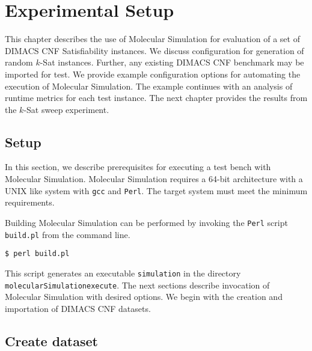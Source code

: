 \chapter{Experimental Setup}


This chapter describes the use of Molecular Simulation for evaluation of a set of DIMACS CNF {\sc Satisfiability} instances.  We discuss configuration for generation of random $k$-{\sc Sat} instances.  Further, any existing DIMACS CNF benchmark may be imported for test.  We provide example configuration options for automating the execution of Molecular Simulation.  The example continues with an analysis of runtime metrics for each test instance.  The next chapter provides the results from the $k$-{\sc Sat} sweep experiment.

	\section{Setup}


In this section, we describe prerequisites for executing a test bench with Molecular Simulation.  Molecular Simulation requires a 64-bit architecture with a UNIX like system with \texttt{gcc} and \texttt{Perl}.  The target system must meet the minimum requirements.  

Building Molecular Simulation can be performed by invoking the \texttt{Perl} script \texttt{build.pl} from the command line.

\begin{center}
\texttt{\$ perl build.pl}
\end{center}

\noindent This script generates an executable \texttt{simulation} in the directory \texttt{molecularSimulationexecute}.  The next sections describe invocation of Molecular Simulation with desired options.  We begin with the creation and importation of DIMACS CNF datasets.

		

	\section{Create dataset}


